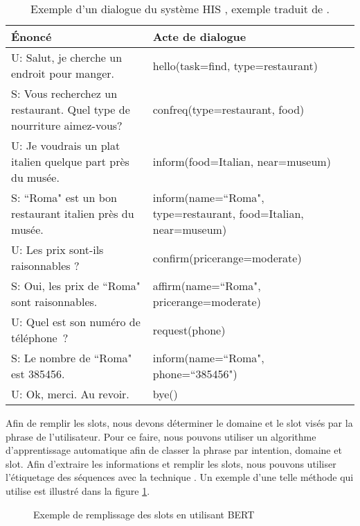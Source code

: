 \documentclass{KodeBook}
\begin{document}
\begin{table}[ht]
	\centering\small
	\begin{tabular}{p{}p{}}
		\hline\hline
		Énoncé & Acte de dialogue \\
		\hline
		U: Salut, je cherche un endroit pour manger.  & hello(task=find, type=restaurant) \\
		S: Vous recherchez un restaurant. Quel type de nourriture aimez-vous?  & confreq(type=restaurant, food) \\
		U: Je voudrais un plat italien quelque part près du musée.  & inform(food=Italian, near=museum)\\
		S: ``Roma" est un bon restaurant italien près du musée.  & inform(name=``Roma", type=restaurant, food=Italian, near=museum) \\
		U: Les prix sont-ils raisonnables ? & confirm(pricerange=moderate) \\
		S: Oui, les prix de ``Roma" sont raisonnables.  & affirm(name=``Roma", pricerange=moderate) \\
		U: Quel est son numéro de téléphone ? & request(phone) \\
		S: Le nombre de ``Roma" est 385456. & inform(name=``Roma", phone=``385456") \\
		U: Ok, merci. Au revoir. & bye() \\
		\hline\hline
	\end{tabular}
	\caption[Exemple d'un dialogue du système HIS.]{Exemple d'un dialogue du système HIS \cite{2010-young-al}, exemple traduit de \cite{2020-jurafsky-martin}.}
	\label{tab:sd-tache-his-exp}
\end{table}

Afin de remplir les slots, nous devons déterminer le domaine et le slot visés par la phrase de l'utilisateur. 
Pour ce faire, nous pouvons utiliser un algorithme d'apprentissage automatique afin de classer la phrase par intention, domaine et slot. 
Afin d'extraire les informations et remplir les slots, nous pouvons utiliser l'étiquetage des séquences avec la technique . 
Un exemple d'une telle méthode qui utilise  est illustré dans la figure \ref{fig:sd-tache-remp-bert}. 

\begin{figure}[!ht]
	\centering
	\caption[Exemple de remplissage des slots en utilisant BERT]{Exemple de remplissage des slots en utilisant BERT \cite{2020-jurafsky-martin}}
	\label{fig:sd-tache-remp-bert}
\end{figure}
\end{document}
